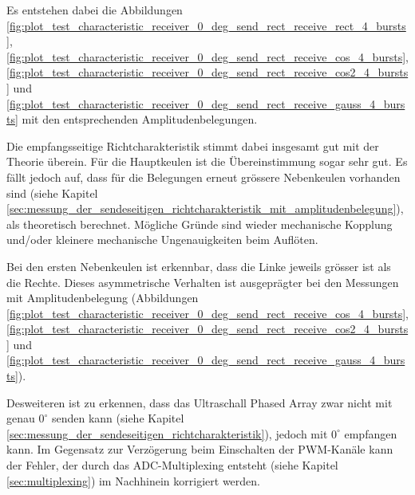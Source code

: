 Es entstehen dabei die Abbildungen \ref{fig:plot_test_characteristic_receiver_0_deg_send_rect_receive_rect_4_bursts}, \ref{fig:plot_test_characteristic_receiver_0_deg_send_rect_receive_cos_4_bursts}, \ref{fig:plot_test_characteristic_receiver_0_deg_send_rect_receive_cos2_4_bursts} und \ref{fig:plot_test_characteristic_receiver_0_deg_send_rect_receive_gauss_4_bursts} mit den entsprechenden Amplitudenbelegungen.

Die empfangsseitige Richtcharakteristik stimmt dabei insgesamt gut mit der Theorie überein. Für die Hauptkeulen ist die Übereinstimmung sogar sehr gut. Es fällt jedoch auf, dass für die Belegungen erneut grössere Nebenkeulen vorhanden sind (siehe Kapitel \ref{sec:messung_der_sendeseitigen_richtcharakteristik_mit_amplitudenbelegung}), als theoretisch berechnet. Mögliche Gründe sind wieder mechanische Kopplung und/oder kleinere mechanische Ungenauigkeiten beim Auflöten.

Bei den ersten Nebenkeulen ist erkennbar, dass die Linke jeweils grösser ist als die Rechte. Dieses asymmetrische Verhalten ist ausgeprägter bei den Messungen mit Amplitudenbelegung (Abbildungen \ref{fig:plot_test_characteristic_receiver_0_deg_send_rect_receive_cos_4_bursts}, \ref{fig:plot_test_characteristic_receiver_0_deg_send_rect_receive_cos2_4_bursts} und \ref{fig:plot_test_characteristic_receiver_0_deg_send_rect_receive_gauss_4_bursts}).

Desweiteren ist zu erkennen, dass das Ultraschall Phased Array zwar nicht mit genau $0^{\circ}$ senden kann (siehe Kapitel \ref{sec:messung_der_sendeseitigen_richtcharakteristik}), jedoch mit $0^{\circ}$ empfangen kann. Im Gegensatz zur Verzögerung beim Einschalten der PWM-Kanäle kann der Fehler, der durch das ADC-Multiplexing entsteht (siehe Kapitel \ref{sec:multiplexing}) im Nachhinein korrigiert werden.

